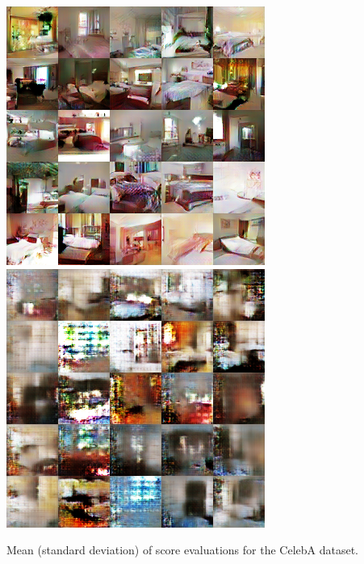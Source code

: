 \documentclass[xcolor={table}]{beamer}
\begin{document}
\begin{frame}{}
\begin{columns}[T, totalwidth=\textwidth]
\begin{column}{.32\textwidth}
\begin{sidefigure4}
      \includegraphics[width=.49\columnwidth]{samples/lsun_rq_16.png}
      ~
      \includegraphics[width=.49\columnwidth]{samples/lsun_wgan_16.png}
      \caption{\textbf{$160 \times 160$ CelebA dataset.} \\
               Samples from
               MMD GAN (left) and WGAN-GP (right) trained with ResNet generator and DCGAN critic.\\
               \vspace*{95pt}
               \textbf{$64 \times 64$ LSUN bedroom dataset.}\\
               Samples from 
               MMD GAN (left) and WGAN-GP (right) models trained with DCGAN 
               architecture with \emph{small critic}\\ ($4\times$ less convolutional filters) .%
               }
    \end{sidefigure4}
    \vspace*{-1.3cm}
    \begin{table}
      \centering
      \vspace{-1cm}
      \caption{Mean (standard deviation) of score evaluations for the CelebA dataset.}
      \label{tab:celeba-scores}

\end{table}
\end{column}
\end{columns}
\end{frame}
\end{document}

